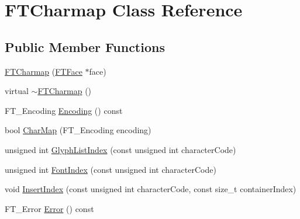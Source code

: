 \hypertarget{class_f_t_charmap}{\section{F\-T\-Charmap Class Reference}
\label{class_f_t_charmap}
}
\subsection*{Public Member Functions}
\begin{DoxyCompactItemize}
\item 
\hyperlink{class_f_t_charmap_a9d19837becbc83acf7f56a5980b2b644}{F\-T\-Charmap} (\hyperlink{class_f_t_face}{F\-T\-Face} $\ast$face)
\item 
virtual \hyperlink{class_f_t_charmap_afcbe1e49ed38810e8b9c2e116ddbbffc}{$\sim$\-F\-T\-Charmap} ()
\item 
F\-T\-\_\-\-Encoding \hyperlink{class_f_t_charmap_a4c119ad30110e00b6b3944288a702c84}{Encoding} () const 
\item 
bool \hyperlink{class_f_t_charmap_a4d182b0faeb7198b4f583b84eaf4cd55}{Char\-Map} (F\-T\-\_\-\-Encoding encoding)
\item 
unsigned int \hyperlink{class_f_t_charmap_a6084cc8ab267b9974980e14f17227f25}{Glyph\-List\-Index} (const unsigned int character\-Code)
\item 
unsigned int \hyperlink{class_f_t_charmap_ab77d9f06a9109608b1734010acecaefd}{Font\-Index} (const unsigned int character\-Code)
\item 
void \hyperlink{class_f_t_charmap_a374e41b6f8b07efb08e5c173cc707354}{Insert\-Index} (const unsigned int character\-Code, const size\-\_\-t container\-Index)
\item 
F\-T\-\_\-\-Error \hyperlink{class_f_t_charmap_a176e217e3e837db5fc4592ceff5ed488}{Error} () const 
\end{DoxyCompactItemize}


